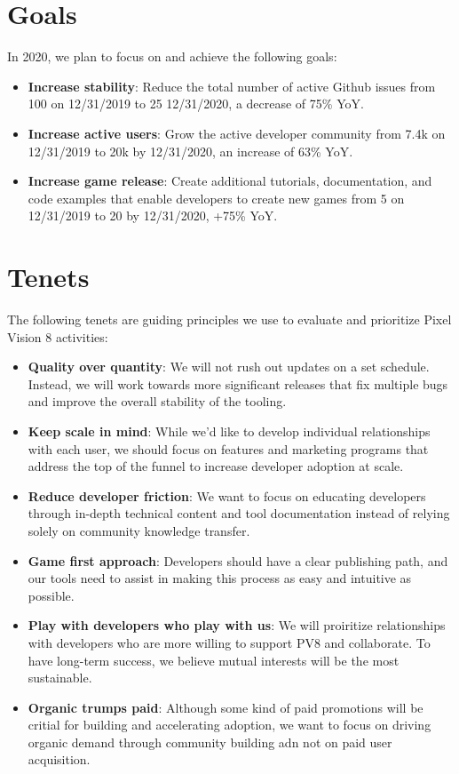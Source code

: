\documentclass{sixpage}
\begin{document}
    \section{Goals}
    In 2020, we plan to focus on and achieve the following goals:
    \begin{itemize}
        \item \textbf{Increase stability}: Reduce the total number of active Github issues from 100 on 12/31/2019 to 25 12/31/2020, a decrease of 75\% YoY.
        \item \textbf{Increase active users}: Grow the active developer community from 7.4k on 12/31/2019 to 20k by 12/31/2020, an increase of 63\% YoY.
        \item \textbf{Increase game release}: Create additional tutorials, documentation, and code examples that enable developers to create new games from 5 on 12/31/2019 to 20 by 12/31/2020, +75\% YoY.
    \end{itemize}


    \section{Tenets}
    The following tenets are guiding principles we use to evaluate and prioritize Pixel Vision 8 activities:
    \begin{itemize}
        \item \textbf{Quality over quantity}: We will not rush out updates on a set schedule. Instead, we will work towards more significant releases that fix multiple bugs and improve the overall stability of the tooling.
        \item \textbf{Keep scale in mind}: While we'd like to develop individual relationships with each user, we should focus on features and marketing programs that address the top of the funnel to increase developer adoption at scale.
        \item \textbf{Reduce developer friction}: We want to focus on educating developers through in-depth technical content and tool documentation instead of relying solely on community knowledge transfer.
        \item \textbf{Game first approach}: Developers should have a clear publishing path, and our tools need to assist in making this process as easy and intuitive as possible.
        \item \textbf{Play with developers who play with us}: We will proiritize relationships with developers who are more willing to support PV8 and collaborate. To have long-term success, we believe mutual interests will be the most sustainable.
        \item \textbf{Organic trumps paid}: Although some kind of paid promotions will be critial for building and accelerating adoption, we want to focus on driving organic demand through community building adn not on paid user acquisition.
    \end{itemize}
\end{document}
